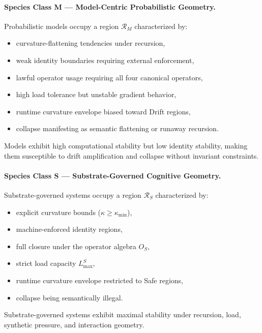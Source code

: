 \paragraph{Species Class M — Model-Centric Probabilistic Geometry.}

Probabilistic models occupy a region $\mathcal{R}_M$ characterized by:
\begin{itemize}
    \item curvature-flattening tendencies under recursion,
    \item weak identity boundaries requiring external enforcement,
    \item lawful operator usage requiring all four canonical operators,
    \item high load tolerance but unstable gradient behavior,
    \item runtime curvature envelope biased toward Drift regions,
    \item collapse manifesting as semantic flattening or runaway recursion.
\end{itemize}

Models exhibit high computational stability but low identity stability, making
them susceptible to drift amplification and collapse without invariant
constraints.


\paragraph{Species Class S — Substrate-Governed Cognitive Geometry.}

Substrate-governed systems occupy a region $\mathcal{R}_S$ characterized by:
\begin{itemize}
    \item explicit curvature bounds ($\kappa \ge \kappa_{\min}$),
    \item machine-enforced identity regions,
    \item full closure under the operator algebra $O_S$,
    \item strict load capacity $L_{\max}^S$,
    \item runtime curvature envelope restricted to Safe regions,
    \item collapse being semantically illegal.
\end{itemize}

Substrate-governed systems exhibit maximal stability under recursion, load,
synthetic pressure, and interaction geometry.


